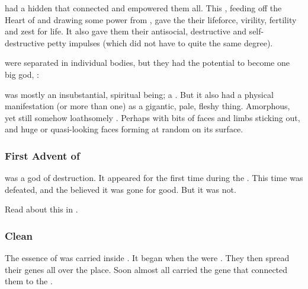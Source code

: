 \Humanity{} had a hidden \matrix{} that connected and empowered them all. 
This \matrix{}, feeding off the Heart of \Miith{} and drawing some power from \Erebos, gave the \humans{} their lifeforce, virility, fertility and zest for life. 
It also gave them their antisocial, destructive and self-destructive petty impulses (which \scathae{} did not have to quite the same degree).

\Humans{} were separated in individual bodies, but they had the potential to become one big god, \Lithrim: 


\Lithrim was mostly an insubstantial, spiritual being; a \matrix. 
But it also had a physical manifestation (or more than one) as a gigantic, pale, fleshy thing. 
Amorphous, yet still somehow loathsomely \human. 
Perhaps with bits of \human faces and limbs sticking out, and huge \human or quasi-\human looking faces forming at random on its surface. 





\subsubsection{First Advent of \Lithrim}
\Lithrim was a \bane god of destruction. 
It appeared for the first time during the . 
This time \Lithrim was defeated, and the \dragons believed it was gone for good. 
But it was not. 

Read about this in . 





\subsubsection{Clean \humans}
The essence of \Lithrim was carried inside \humans.
It began when the  were . 
They then spread their genes all over the place. 
Soon almost all \humans carried the gene that connected them to the \Lithrim \matrix.

